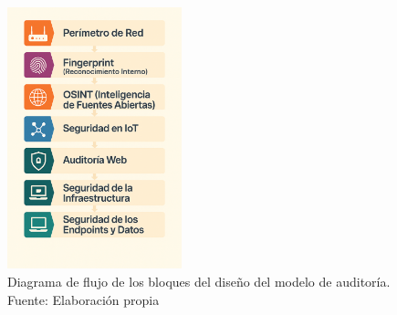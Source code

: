 \documentclass[a4paper, 10pt]{article}
\begin{document}
\begin{figure}[H]
    \centering
    \includegraphics[width=0.45\textwidth]{images/diseno.png}
    \caption{Diagrama de flujo de los bloques del diseño del modelo de auditoría. Fuente: Elaboración propia}
    \label{fig:diseno_modelo_auditoria}
\end{figure}
\end{document}
